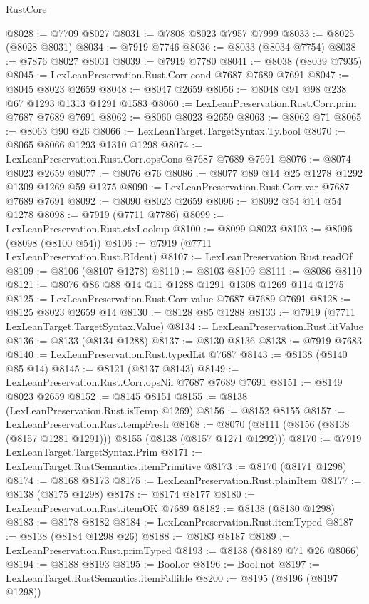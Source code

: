\begin{lexlean}{RustCore}
\begin{coremodule}
@8028 := @7709 @8027
@8031 := @7808 @8023 @7957 @7999
@8033 := @8025 (@8028 @8031)
@8034 := @7919 @7746
@8036 := @8033 (@8034 @7754)
@8038 := @7876 @8027 @8031
@8039 := @7919 @7780
@8041 := @8038 (@8039 @7935)
@8045 := LexLeanPreservation.Rust.Corr.cond @7687 @7689 @7691
@8047 := @8045 @8023 @2659
@8048 := @8047 @2659
@8056 := @8048 @91 @98 @238 @67 @1293 @1313 @1291 @1583
@8060 := LexLeanPreservation.Rust.Corr.prim @7687 @7689 @7691
@8062 := @8060 @8023 @2659
@8063 := @8062 @71
@8065 := @8063 @90 @26
@8066 := LexLeanTarget.TargetSyntax.Ty.bool
@8070 := @8065 @8066 @1293 @1310 @1298
@8074 := LexLeanPreservation.Rust.Corr.opsCons @7687 @7689 @7691
@8076 := @8074 @8023 @2659
@8077 := @8076 @76
@8086 := @8077 @89 @14 @25 @1278 @1292 @1309 @1269 @59 @1275
@8090 := LexLeanPreservation.Rust.Corr.var @7687 @7689 @7691
@8092 := @8090 @8023 @2659
@8096 := @8092 @54 @14 @54 @1278
@8098 := @7919 (@7711 @7786)
@8099 := LexLeanPreservation.Rust.ctxLookup
@8100 := @8099 @8023
@8103 := @8096 (@8098 (@8100 @54))
@8106 := @7919 (@7711 LexLeanPreservation.Rust.RIdent)
@8107 := LexLeanPreservation.Rust.readOf
@8109 := @8106 (@8107 @1278)
@8110 := @8103 @8109
@8111 := @8086 @8110
@8121 := @8076 @86 @88 @14 @11 @1288 @1291 @1308 @1269 @114 @1275
@8125 := LexLeanPreservation.Rust.Corr.value @7687 @7689 @7691
@8128 := @8125 @8023 @2659 @14
@8130 := @8128 @85 @1288
@8133 := @7919 (@7711 LexLeanTarget.TargetSyntax.Value)
@8134 := LexLeanPreservation.Rust.litValue
@8136 := @8133 (@8134 @1288)
@8137 := @8130 @8136
@8138 := @7919 @7683
@8140 := LexLeanPreservation.Rust.typedLit @7687
@8143 := @8138 (@8140 @85 @14)
@8145 := @8121 (@8137 @8143)
@8149 := LexLeanPreservation.Rust.Corr.opsNil @7687 @7689 @7691
@8151 := @8149 @8023 @2659
@8152 := @8145 @8151
@8155 := @8138 (LexLeanPreservation.Rust.isTemp @1269)
@8156 := @8152 @8155
@8157 := LexLeanPreservation.Rust.tempFresh
@8168 := @8070 (@8111 (@8156 (@8138 (@8157 @1281 @1291))) @8155 (@8138 (@8157 @1271 @1292)))
@8170 := @7919 LexLeanTarget.TargetSyntax.Prim
@8171 := LexLeanTarget.RustSemantics.itemPrimitive
@8173 := @8170 (@8171 @1298)
@8174 := @8168 @8173
@8175 := LexLeanPreservation.Rust.plainItem
@8177 := @8138 (@8175 @1298)
@8178 := @8174 @8177
@8180 := LexLeanPreservation.Rust.itemOK @7689
@8182 := @8138 (@8180 @1298)
@8183 := @8178 @8182
@8184 := LexLeanPreservation.Rust.itemTyped
@8187 := @8138 (@8184 @1298 @26)
@8188 := @8183 @8187
@8189 := LexLeanPreservation.Rust.primTyped
@8193 := @8138 (@8189 @71 @26 @8066)
@8194 := @8188 @8193
@8195 := Bool.or
@8196 := Bool.not
@8197 := LexLeanTarget.RustSemantics.itemFallible
@8200 := @8195 (@8196 (@8197 @1298))

\end{coremodule}
\end{lexlean}

